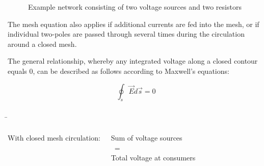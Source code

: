 \begin{frame}
{		
		
		
		
		
		
		
		
		
		\begin{figure}[h!]
			\renewcommand{\figurename}{Figure}
			\begin{center}

				
				
			\end{center}
			\caption{Example network consisting of two voltage sources and two resistors}
			\label{fig:masche}
		\end{figure}
		
		The mesh equation also applies if additional currents are fed into the mesh,
        or if individual two-poles are passed through several times during the circulation around a closed mesh.
		
		The general relationship, whereby any integrated voltage along a closed contour equals 0, can
        be described as follows according to Maxwell's equations:
 
		
		\begin{equation}
			\oint_{s} \vec{E} d\vec{s} = 0
		\end{equation}
		
		
		
	}
	
	
	\b{
		\begin{columns}
			
			\vspace{-70pt}
			
			With closed mesh circulation:
			\vspace{-5pt}
			\begin{Key point}{}
				
				\begin{center}

					Sum of voltage sources\\
					\quad \quad\ \quad =\\
					Total voltage at consumers
					
				\end{center}
			\end{Key point}
			
			
			\vspace{10pt}
			

\end{columns}}
\end{frame}
